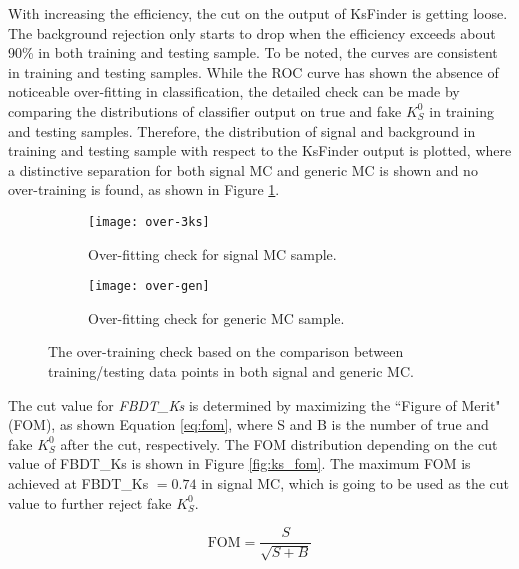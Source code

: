 With increasing the efficiency, the cut on the output of KsFinder is getting loose. The background rejection only starts to drop when the efficiency exceeds about 90\% in both training and testing sample. To be noted, the curves are consistent in training and testing samples. 
While the ROC curve has shown the absence of noticeable over-fitting in classification, the detailed check can be made by comparing the distributions of classifier output on true and fake $K_S^0$ in training and testing samples. Therefore, the distribution of signal and background in training and testing sample with respect to the KsFinder output is plotted, where a distinctive separation for both signal MC and generic MC is shown and no over-training is found, as shown in Figure \ref{fig:ks_overtraining}.
\begin{figure}[H]
	\begin{subfigure}{1\linewidth}
		\centering
		\texttt{[image: over-3ks]}
		\caption{Over-fitting check for signal MC sample.}
	\end{subfigure}
  	\vspace{0.3cm}

	\begin{subfigure}{1\linewidth}
		\centering
		\texttt{[image: over-gen]}
		\caption{Over-fitting check for generic MC sample.}
	\end{subfigure}
\caption{The over-training check based on the comparison between training/testing data points in both signal and generic MC.}
\label{fig:ks_overtraining}
	\vspace{0.3cm}
	
\end{figure}

The cut value for \textit{FBDT\_Ks} is determined by maximizing the ``Figure of Merit" (FOM), as shown Equation \ref{eq:fom}, where S and B is the number of true and fake $K_S^0$ after the cut, respectively. The FOM distribution depending on the cut value of FBDT\_Ks is shown in Figure \ref{fig:ks_fom}. The maximum FOM is achieved at FBDT\_Ks $= 0.74$ in signal MC, which is going to be used as the cut value to further reject fake $K_S^0$.

\begin{equation}\label{eq:fom}
	\text{FOM} = \frac{S}{\sqrt{S+B}}
\end{equation}

